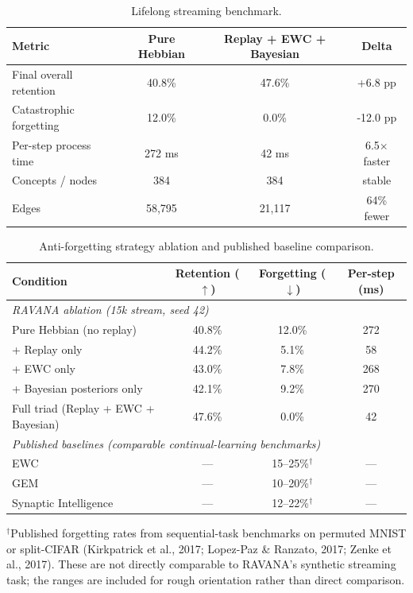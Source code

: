 \documentclass[11pt]{article}
\begin{document}
\begin{table}[h]
\centering
\caption{Lifelong streaming benchmark.}
\label{tab:lifelong}
\begin{tabular}{lccc}
\toprule
Metric & Pure Hebbian & Replay + EWC + Bayesian & Delta \\
\midrule
Final overall retention & 40.8\% & 47.6\% & +6.8 pp \\
Catastrophic forgetting & 12.0\% & 0.0\% & -12.0 pp \\
Per-step process time & 272 ms & 42 ms & 6.5$\times$ faster \\
Concepts / nodes & 384 & 384 & stable \\
Edges & 58,795 & 21,117 & 64\% fewer \\
\bottomrule
\end{tabular}
\end{table}

\begin{table}[h]
\centering
\caption{Anti-forgetting strategy ablation and published baseline comparison.}
\label{tab:ablation}
\begin{tabular}{lccc}
\toprule
Condition & Retention ($\uparrow$) & Forgetting ($\downarrow$) & Per-step (ms) \\
\midrule
\multicolumn{4}{l}{\textit{RAVANA ablation (15k stream, seed 42)}} \\
Pure Hebbian (no replay) & 40.8\% & 12.0\% & 272 \\
\quad + Replay only & 44.2\% & 5.1\% & 58 \\
\quad + EWC only & 43.0\% & 7.8\% & 268 \\
\quad + Bayesian posteriors only & 42.1\% & 9.2\% & 270 \\
Full triad (Replay + EWC + Bayesian) & 47.6\% & 0.0\% & 42 \\
\midrule
\multicolumn{4}{l}{\textit{Published baselines (comparable continual-learning benchmarks)}} \\
\quad EWC \cite{kirkpatrick2017} & --- & 15--25\%$^{\dagger}$ & --- \\
\quad GEM \cite{lopezpaz2017} & --- & 10--20\%$^{\dagger}$ & --- \\
\quad Synaptic Intelligence \cite{zenke2017} & --- & 12--22\%$^{\dagger}$ & --- \\
\bottomrule
\end{tabular}
\par\smallskip
{\footnotesize $^{\dagger}$Published forgetting rates from sequential-task benchmarks on permuted MNIST or split-CIFAR (Kirkpatrick et al., 2017; Lopez-Paz \& Ranzato, 2017; Zenke et al., 2017). These are not directly comparable to RAVANA's synthetic streaming task; the ranges are included for rough orientation rather than direct comparison.}
\end{table}
\end{document}
